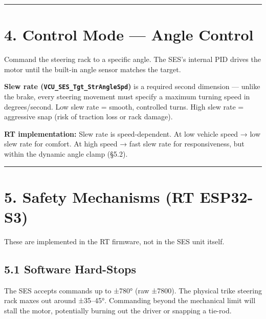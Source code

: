 \documentclass[12pt,a4paper,oneside]{report}
\begin{document}
\begin{center}\rule{0.5\linewidth}{0.5pt}\end{center}

\section{4. Control Mode --- Angle Control}\label{control-mode-angle-control}

Command the steering rack to a specific angle. The SES's internal PID drives
the motor until the built-in angle sensor matches the target.

\textbf{Slew rate (\texttt{VCU\_SES\_Tgt\_StrAngleSpd})} is a required second
dimension --- unlike the brake, every steering movement must specify a maximum
turning speed in degrees/second. Low slew rate = smooth, controlled turns. High
slew rate = aggressive snap (risk of traction loss or rack damage).

\textbf{RT implementation:} Slew rate is speed-dependent. At low vehicle speed →
low slew rate for comfort. At high speed → fast slew rate for responsiveness,
but within the dynamic angle clamp (§5.2).

\begin{center}\rule{0.5\linewidth}{0.5pt}\end{center}

\section{5. Safety Mechanisms (RT
ESP32-S3)}\label{safety-mechanisms-rt-esp32-s3}

These are implemented in the RT firmware, not in the SES unit itself.

\subsection{5.1 Software Hard-Stops}\label{software-hard-stops}

The SES accepts commands up to ±780° (raw ±7800). The physical trike steering
rack maxes out around ±35--45°. Commanding beyond the mechanical limit will
stall the motor, potentially burning out the driver or snapping a tie-rod.
\end{document}
